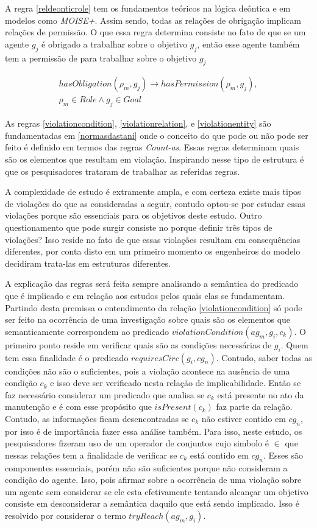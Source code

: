 A regra \ref{reldeonticrole} tem os fundamentos teóricos na lógica deôntica e em modelos como \textit{MOISE+}. Assim sendo, todas as relações de obrigação implicam relações de permissão. O que essa regra determina consiste no fato de que se um agente $g_j$ é obrigado a trabalhar sobre o objetivo $g_j$, então esse agente também tem a permissão de para trabalhar sobre o objetivo $g_j$ 

\begin{eqnarray}\label{reldeonticrole}
	hasObligation(\rho_m,g_j) \to hasPermission(\rho_m,g_j), \nonumber \\
    \rho_m \in Role \wedge g_j \in Goal
\end{eqnarray}

As regras \ref{violationcondition}, \ref{violationrelation}, e \ref{violationentity} são fundamentadas em \ref{normasdastani} onde o conceito do que pode ou não pode ser feito é definido em termos das regras \textit{Count-as}. Essas regras determinam quais são os elementos que resultam em violação. Inspirando nesse tipo de estrutura é que os pesquisadores trataram de trabalhar as referidas regras. 

A complexidade de estudo é extramente ampla, e com certeza existe mais tipos de violações do que as consideradas a seguir, contudo optou-se por estudar essas violações porque são essenciais para os objetivos deste estudo. Outro questionamento que pode surgir consiste no porque definir três tipos de violações? Isso reside no fato de que essas violações resultam em consequências diferentes, por conta disto em um primeiro momento os engenheiros do modelo decidiram trata-las em estruturas diferentes. 

A explicação das regras será feita sempre analisando a semântica do predicado que é implicado e em relação aos estudos pelos quais elas se fundamentam. Partindo desta premissa o entendimento da relação \ref{violationcondition} só pode ser feito na ocorrência de uma  investigação sobre quais são os elementos que semanticamente correspondem ao predicado $violationCondition(ag_m,g_i,c_k)$. O primeiro ponto reside em verificar quais são as condições necessárias de $g_i$. Quem tem essa finalidade é o predicado $requiresCirc(g_i,cg_n)$. Contudo, saber todas as condições não são o suficientes, pois a violação acontece na ausência de uma condição $c_k$ e isso deve ser verificado nesta relação de implicabilidade. Então se faz necessário considerar um predicado que analisa se $c_k$ está presente no ato da manutenção e é com esse propósito que $isPresent(c_k)$ faz parte da relação. Contudo, as informações ficam desencontradas se $c_k$ não estiver contido em $cg_n$, por isso é de importância fazer essa análise também. Para isso, neste estudo, os pesquisadores fizeram uso de um operador de conjuntos cujo simbolo é $\in$ que nessas relações tem a finalidade de verificar se $c_k$ está contido em $cg_n$. Esses são componentes essenciais, porém não são suficientes porque não consideram a condição do agente. Isso, pois afirmar sobre a ocorrência de uma violação sobre um agente sem considerar se ele esta efetivamente tentando alcançar um objetivo consiste em desconsiderar a semântica daquilo que está sendo implicado. Isso é resolvido por considerar o termo  $tryReach(ag_m,g_i)$. 


